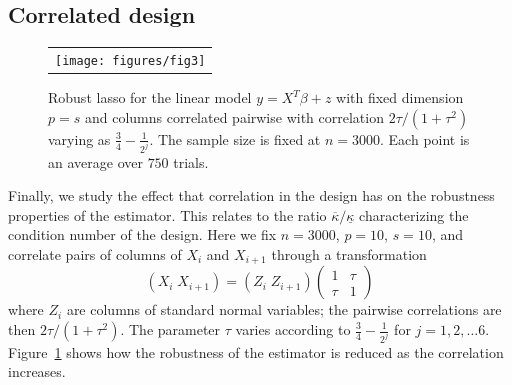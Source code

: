\subsection{Correlated design}

\begin{figure}[ht]
  \vskip20pt
    \begin{center}
      \begin{tabular}{c}
        \texttt{[image: figures/fig3]}
      \end{tabular}
    \end{center}
  \caption{Robust lasso for the linear model  $y=X^T\beta + z$ with 
  fixed dimension $p = s$ and columns correlated pairwise with correlation 
  $2\tau/(1+\tau^2)$ varying as $\frac{3}{4} - \frac{1}{2^j}$. The sample size is fixed at $n=3000$. Each point is an average over $750$ trials.}
  \label{fig:corr}
  \end{figure}
  
Finally, we study the effect that correlation in the design has on the robustness properties
of the estimator. This relates to 
the ratio $\overline{\kappa}/\underline{\kappa}$ characterizing the condition number of the design.
Here we fix $n=3000$, $p=10$, $s=10$, and correlate pairs of columns of $X_{i}$ and $X_{i+1}$
through a transformation 
\begin{equation*}
  (X_{i} \; X_{i+1}) = (Z_{i} \; Z_{i+1}) \begin{pmatrix}1 & \tau \\ \tau & 1\end{pmatrix}
\end{equation*}
where $Z_i$ are columns of standard normal variables; the pairwise correlations are then $2\tau/(1+\tau^2)$.
The parameter $\tau$ varies according to $\frac{3}{4} - \frac{1}{2^j}$ 
for $j=1,2,\ldots 6$. Figure~\ref{fig:corr} shows how the robustness of the estimator is reduced as the correlation increases.

